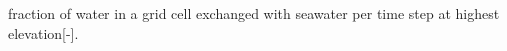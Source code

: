 fraction of water in a grid cell exchanged with seawater per time step at highest elevation\mbox{[}-\/\mbox{]}. 
